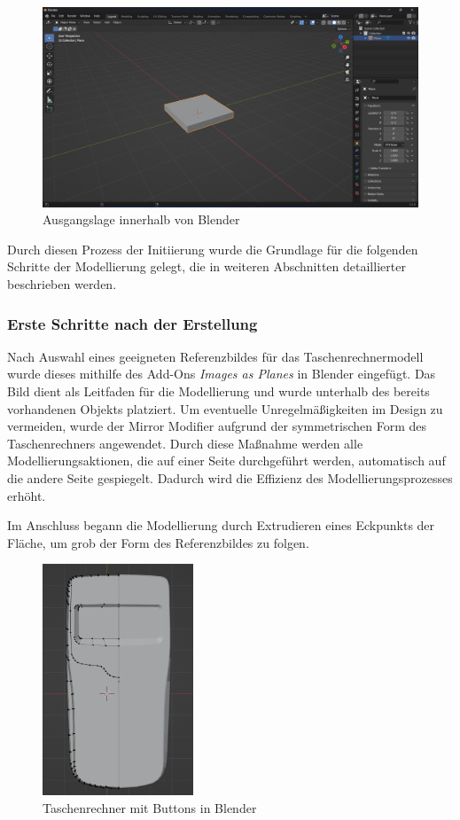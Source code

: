 \begin{figure}[H]
    \centering
    \includegraphics[width=1\textwidth]{images/AusgangslageTaschenrechner.png}
    \caption{Ausgangslage innerhalb von Blender}
    \label{fig:Ausgangslage}
\end{figure}

Durch diesen Prozess der Initiierung wurde die Grundlage für die folgenden Schritte der Modellierung gelegt, die in
weiteren Abschnitten detaillierter beschrieben werden.

\subsubsection*{Erste Schritte nach der Erstellung}
Nach Auswahl eines geeigneten Referenzbildes für das Taschenrechnermodell wurde dieses mithilfe des
Add-Ons \textit{Images as Planes} in Blender eingefügt. Das Bild dient als Leitfaden für die Modellierung und wurde
unterhalb des bereits vorhandenen Objekts platziert. Um eventuelle Unregelmäßigkeiten im Design zu vermeiden, wurde der
Mirror Modifier aufgrund der symmetrischen Form des Taschenrechners angewendet. Durch diese Maßnahme werden alle
Modellierungsaktionen, die auf einer Seite durchgeführt werden, automatisch auf die andere Seite gespiegelt. Dadurch
wird die Effizienz des Modellierungsprozesses erhöht.

Im Anschluss begann die Modellierung durch Extrudieren eines Eckpunkts der Fläche, um grob der Form des Referenzbildes zu folgen.

\begin{figure}[H]
    \centering
    \includegraphics[width=0.4\textwidth]{images/basis.png}
    \caption{Taschenrechner mit Buttons in Blender}
    \label{fig:Basis}
\end{figure}


